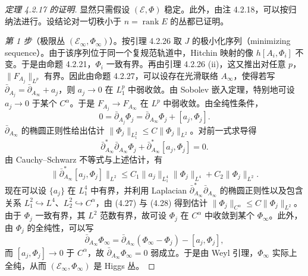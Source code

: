 \begin{proof}[定理 4.2.17 的证明]
显然只需假设 $(\mathcal{E},\Phi)$ 稳定。此外，由注 4.2.18，可以按归纳法进行。设结论对一切秩小于 $n=\operatorname{rank}E$ 的丛都已证明。

\emph{第 1 步}（极限丛 $(\mathcal{E}_\infty,\Phi_\infty)$）。按引理 4.2.26 取 $J$ 的极小化序列（minimizing sequence）。由于该序列位于同一个复规范轨道中，Hitchin 映射的像 $h[A_i,\Phi_i]$ 不变。于是由命题 4.2.21，$\Phi_i$ 一致有界。再由引理 4.2.26 (ii)，这又推出对任意 $p$，$\|F_{A_j}\|_{L^p}$ 有界。因此由命题 4.2.27，可以设存在光滑联络 $A_\infty$，使得若写 $\bar\partial_{A_j}=\bar\partial_{A_\infty}+a_j$，则 $a_j\to0$ 在 $L^p_1$ 中弱收敛。由 Sobolev 嵌入定理，特别地可设 $a_j\to0$ 于某个 $C^\alpha$。于是 $F_{A_j}\to F_{A_\infty}$ 在 $L^p$ 中弱收敛。由全纯性条件，
\[
0=\bar\partial_{A_j}\Phi_j=\bar\partial_{A_\infty}\Phi_j+[a_j,\Phi_j].
\]
$\bar\partial_{A_\infty}$ 的椭圆正则性给出估计 $\|\Phi_j\|_{L^2_1}\le C\|\Phi_j\|_{L^2}$。对前一式求导得
\begin{equation}
\bar\partial^*_{A_\infty}\bar\partial_{A_\infty}\Phi_j+\bar\partial^*_{A_\infty}[a_j,\Phi_j]=0.
\label{eq:4.27}
\tag{4.27}
\end{equation}
由 Cauchy–Schwarz 不等式与上述估计，有
\begin{equation}
\|\bar\partial^*_{A_\infty}[a_j,\Phi_j]\|_{L^2}\le C_1\|a_j\|_{L^4_1}\|\Phi_j\|_{L^4}+C_2\|\Phi_j\|_{L^2}.
\label{eq:4.28}
\tag{4.28}
\end{equation}
现在可以设 $\{a_j\}$ 在 $L^4_1$ 中有界，并利用 Laplacian $\bar\partial^*_{A_\infty}\bar\partial_{A_\infty}$ 的椭圆正则性以及包含关系 $L^2_1\hookrightarrow L^4$、$L^2_2\hookrightarrow C^\alpha$，由 (4.27) 与 (4.28) 得到估计 $\|\Phi_j\|_{C^\alpha}\le C\|\Phi_j\|_{L^2}$。由于 $\Phi_j$ 一致有界，其 $L^2$ 范数有界，故可设 $\Phi_j$ 在 $C^\alpha$ 中收敛到某个 $\Phi_\infty$。此外，由 $\Phi_j$ 的全纯性，可以写
\[
\bar\partial_{A_\infty}\Phi_\infty=\bar\partial_{A_\infty}(\Phi_\infty-\Phi_j)-[a_j,\Phi_j],
\]
而 $[a_j,\Phi_j]\to0$ 于 $C^\alpha$，故 $\bar\partial_{A_\infty}\Phi_\infty=0$ 弱成立。于是由 Weyl 引理，$\Phi_\infty$ 实际上全纯，从而 $(\mathcal{E}_\infty,\Phi_\infty)$ 是 Higgs 丛。
\end{proof}
